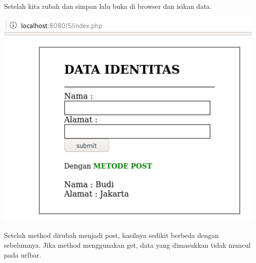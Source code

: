 \documentclass[a4paper,12pt]{article}
\begin{document}
Setelah kita rubah dan simpan lalu buka di browser dan isikan data.
\begin{center}
    \includegraphics[scale=.6]{4.png} 
\end{center}
Setelah method dirubah menjadi post, hasilnya sedikit berbeda dengan sebelumnya. Jika method menggunakan get, data yang dimasukkan tidak muncul pada urlbar.

\newpage
\end{document}

